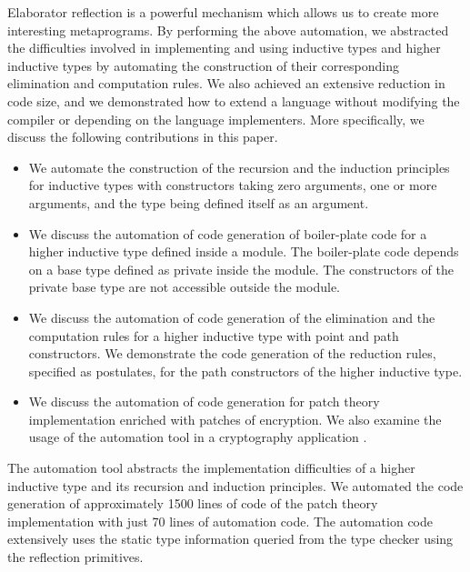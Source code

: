 \documentclass[sigplan,10pt]{acmart}
\begin{document}
Elaborator reflection is a powerful mechanism which allows us to create more interesting metaprograms. By performing the above automation, we abstracted the difficulties involved in implementing and using inductive types and higher inductive types by automating the construction of their corresponding elimination and computation rules. We also achieved an extensive reduction in code size, and we demonstrated how to extend a language without modifying the compiler or depending on the language implementers. More specifically, we discuss the following contributions in this paper.

\begin{itemize}
\item We automate the construction of the recursion and the induction principles for inductive types with constructors taking zero arguments, one or more arguments, and the type being defined itself as an argument.

\item We discuss the automation of code generation of boiler-plate code for a higher inductive type defined inside a module. The boiler-plate code depends on a base type defined as private inside the module. The constructors of the private base type are not accessible outside the module.

\item We discuss the automation of code generation of the elimination and the computation rules for a higher inductive type with point and path constructors. We demonstrate the code generation of the reduction rules, specified as postulates, for the path constructors of the higher inductive type.

\item We discuss the automation of code generation for patch theory \cite{Angiuli-2014} implementation enriched with patches of encryption. We also examine the usage of the automation tool in a cryptography application \cite{Paventhan-2018}.
\end{itemize}

The automation tool abstracts the implementation difficulties of a higher inductive type and its recursion and induction principles. We automated the code generation of approximately 1500 lines of code of the patch theory implementation with just 70 lines of automation code. The automation code extensively uses the static type information queried from the type checker using the reflection primitives.
\end{document}
